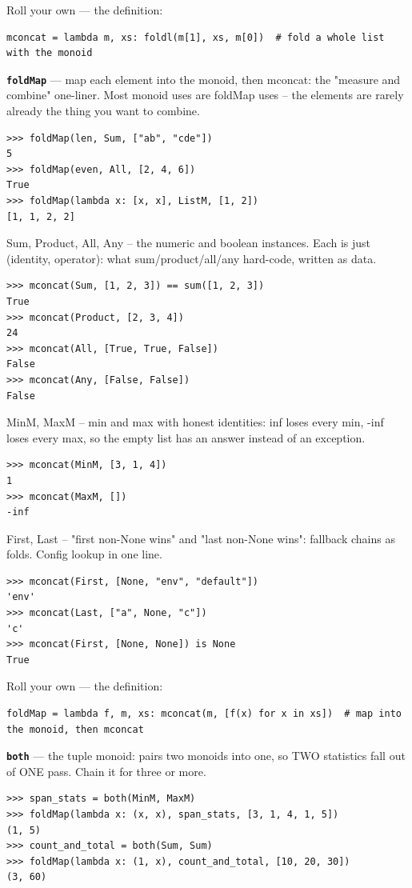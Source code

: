 \documentclass[10pt,letterpaper]{article}
\begin{document}
Roll your own --- the definition:

\begin{lstlisting}[style=ex]
mconcat = lambda m, xs: foldl(m[1], xs, m[0])  # fold a whole list with the monoid
\end{lstlisting}
\textbf{\texttt{foldMap}} --- map each element into the monoid, then mconcat: the "measure and combine" one-liner. Most monoid uses are foldMap uses -- the elements are rarely already the thing you want to combine.
\begin{lstlisting}[style=ex]
>>> foldMap(len, Sum, ["ab", "cde"])
5
>>> foldMap(even, All, [2, 4, 6])
True
>>> foldMap(lambda x: [x, x], ListM, [1, 2])
[1, 1, 2, 2]
\end{lstlisting}

Sum, Product, All, Any -- the numeric and boolean instances. Each is just (identity, operator): what sum/product/all/any hard-code, written as data.

\begin{lstlisting}[style=ex]
>>> mconcat(Sum, [1, 2, 3]) == sum([1, 2, 3])
True
>>> mconcat(Product, [2, 3, 4])
24
>>> mconcat(All, [True, True, False])
False
>>> mconcat(Any, [False, False])
False
\end{lstlisting}

MinM, MaxM -- min and max with honest identities: inf loses every min, -inf loses every max, so the empty list has an answer instead of an exception.

\begin{lstlisting}[style=ex]
>>> mconcat(MinM, [3, 1, 4])
1
>>> mconcat(MaxM, [])
-inf
\end{lstlisting}

First, Last -- "first non-None wins" and "last non-None wins": fallback chains as folds. Config lookup in one line.

\begin{lstlisting}[style=ex]
>>> mconcat(First, [None, "env", "default"])
'env'
>>> mconcat(Last, ["a", None, "c"])
'c'
>>> mconcat(First, [None, None]) is None
True
\end{lstlisting}

Roll your own --- the definition:

\begin{lstlisting}[style=ex]
foldMap = lambda f, m, xs: mconcat(m, [f(x) for x in xs])  # map into the monoid, then mconcat
\end{lstlisting}
\textbf{\texttt{both}} --- the tuple monoid: pairs two monoids into one, so TWO statistics fall out of ONE pass. Chain it for three or more.
\begin{lstlisting}[style=ex]
>>> span_stats = both(MinM, MaxM)
>>> foldMap(lambda x: (x, x), span_stats, [3, 1, 4, 1, 5])
(1, 5)
>>> count_and_total = both(Sum, Sum)
>>> foldMap(lambda x: (1, x), count_and_total, [10, 20, 30])
(3, 60)
\end{lstlisting}
\end{document}
